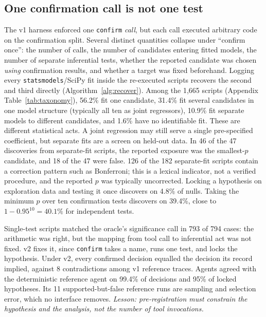 \subsection{One confirmation call is not one test}
\label{sec:multitest}
The v1 harness enforced one \texttt{confirm} \emph{call}, but each call
executed arbitrary code on the confirmation split. Several distinct
quantities collapse under ``confirm once'': the number of calls, the number
of candidates entering fitted models, the number of separate inferential
tests, whether the reported candidate was chosen \emph{using} confirmation
results, and whether a target was fixed beforehand. Logging every
\texttt{statsmodels}/SciPy fit inside the re-executed scripts recovers the
second and third directly (Algorithm~\ref{alg:recover}). Among the 1,665
scripts (Appendix Table~\ref{tab:taxonomy}), 56.2\% fit one candidate,
31.4\% fit several candidates in one model structure (typically all ten as
joint regressors), 10.9\% fit separate models to different candidates, and
1.6\% have no identifiable fit.
These are different statistical acts. A joint regression may still serve a
single pre-specified coefficient, but separate fits are a screen on held-out
data. In 46 of the 47 discoveries from separate-fit scripts, the reported
exposure was the smallest-$p$ candidate, and 18 of the 47 were false. 126 of the 182 separate-fit scripts contain a correction pattern such as
Bonferroni; this is a lexical indicator, not a verified procedure, and the
reported $p$ was typically uncorrected. Locking a hypothesis on exploration data and testing it once
discovers on 4.8\% of nulls. Taking the minimum $p$ over ten confirmation
tests discovers on 39.4\%, close to $1-0.95^{10}=40.1\%$ for independent tests.

Single-test scripts matched the oracle's significance call in 793 of 794
cases: the arithmetic was right, but the mapping from tool call to
inferential act was not fixed. v2 fixes it, since \texttt{confirm} takes a
name, runs one test, and locks the hypothesis. Under v2, every confirmed
decision equalled the decision its record implied, against 8 contradictions
among v1 reference traces. Agents agreed with the deterministic reference
agent on 99.4\% of decisions and 95\% of locked hypotheses. Its 11 supported-but-false reference runs are sampling and selection error,
which no interface removes. \emph{Lesson: pre-registration must constrain the hypothesis and the
analysis, not the number of tool invocations.}

